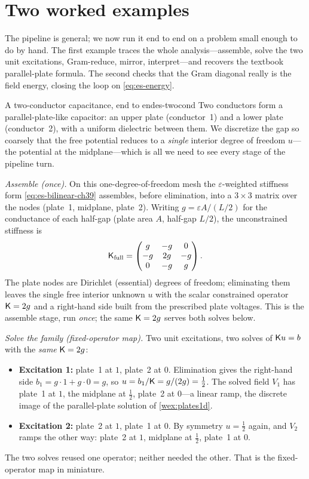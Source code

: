 \section{Two worked examples}
\label{sec:es-worked}

The pipeline is general; we now run it end to end on a problem small enough to do by
hand. The first example traces the whole analysis---assemble, solve the two unit
excitations, Gram-reduce, mirror, interpret---and recovers the textbook
parallel-plate formula. The second checks that the Gram diagonal really is the field
energy, closing the loop on \cref{eq:es-energy}.

\begin{workedexample}{A two-conductor capacitance, end to end}{es-twocond}
Two conductors form a parallel-plate-like capacitor: an upper plate (conductor~1)
and a lower plate (conductor~2), with a uniform dielectric between them. We discretize
the gap so coarsely that the free potential reduces to a \emph{single} interior
degree of freedom $u$---the potential at the midplane---which is all we need to see
every stage of the pipeline turn.

\medskip
\emph{Assemble (once).} On this one-degree-of-freedom mesh the $\varepsilon$-weighted
stiffness form \cref{eq:es-bilinear-ch39} assembles, before elimination, into a
$3\times3$ matrix over the nodes (plate~1, midplane, plate~2). Writing
$g=\varepsilon A/(L/2)$ for the conductance of each half-gap (plate area $A$,
half-gap $L/2$), the unconstrained stiffness is
\[
  \mathsf{K}_{\text{full}} =
  \begin{pmatrix} g & -g & 0 \\ -g & 2g & -g \\ 0 & -g & g \end{pmatrix}.
\]
The plate nodes are Dirichlet (essential) degrees of freedom; eliminating them
leaves the single free interior unknown $u$ with the scalar constrained operator
$\mathsf{K}=2g$ and a right-hand side built from the prescribed plate voltages. This is
the assemble stage, run \emph{once}; the same $\mathsf{K}=2g$ serves both solves below.

\medskip
\emph{Solve the family (fixed-operator map).} Two unit excitations, two solves of
$\mathsf{K} u=b$ with the \emph{same} $\mathsf{K}=2g$:
\begin{itemize}[nosep]
  \item \textbf{Excitation 1:} plate~1 at $1$, plate~2 at $0$. Elimination gives the
  right-hand side $b_1=g\cdot1+g\cdot0=g$, so $u=b_1/\mathsf{K}=g/(2g)=\tfrac12$. The solved
  field $V_1$ has plate~1 at $1$, the midplane at $\tfrac12$, plate~2 at $0$---a linear
  ramp, the discrete image of the parallel-plate solution of \cref{wex:plates1d}.
  \item \textbf{Excitation 2:} plate~2 at $1$, plate~1 at $0$. By symmetry $u=\tfrac12$
  again, and $V_2$ ramps the other way: plate~2 at $1$, midplane at $\tfrac12$,
  plate~1 at $0$.
\end{itemize}
The two solves reused one operator; neither needed the other. That is the
fixed-operator map in miniature.


\end{workedexample}

